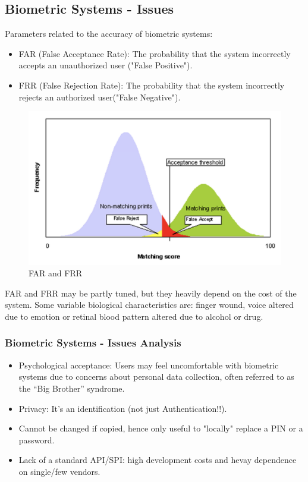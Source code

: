 \subsection*{Biometric Systems - Issues}
Parameters related to the accuracy of biometric systems:
\begin{multicols}{2}
    \raggedcolumns

    \begin{itemize}
        \item FAR (False Acceptance Rate): The probability that the system incorrectly accepts an unauthorized user ("False Positive").
        \item FRR (False Rejection Rate): The probability that the system incorrectly rejects an authorized user("False Negative").
    \end{itemize}
\columnbreak

    \begin{figure}[H]
        \centering
        \includegraphics[width=\linewidth]{Images/Authentication/farrfrr.png}
        \caption{FAR and FRR}
    \end{figure}
\end{multicols}
FAR and FRR may be partly tuned, but they heavily depend on the cost of the system. Some variable biological characteristics are: finger wound, voice altered due to emotion or retinal blood pattern altered due to alcohol or drug.

\subsubsection*{Biometric Systems - Issues Analysis}

\begin{itemize}
    \item Psychological acceptance: Users may feel uncomfortable with biometric systems due to concerns about personal data collection, often referred to as the “Big Brother” syndrome. 
    \item Privacy: It's an identification (not just Authentication!!).
    \item Cannot be changed if copied, hence only useful to "locally" replace a PIN or a password.
    \item Lack of a standard API/SPI: high development costs and hevay dependence on single/few vendors.
\end{itemize}

